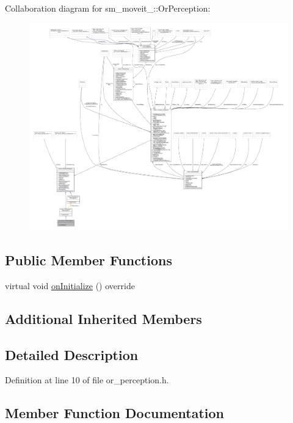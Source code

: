 Collaboration diagram for sm\+\_\+moveit\+\_\+:\+:Or\+Perception\+:
\nopagebreak
\begin{figure}[H]
\begin{center}
\leavevmode
\includegraphics[width=350pt]{classsm__moveit__4_1_1OrPerception__coll__graph}
\end{center}
\end{figure}
\subsection*{Public Member Functions}
\begin{DoxyCompactItemize}
\item 
virtual void \hyperlink{classsm__moveit__4_1_1OrPerception_a3dee7db3c38b7873653999b893d29bbf}{on\+Initialize} () override
\end{DoxyCompactItemize}
\subsection*{Additional Inherited Members}


\subsection{Detailed Description}


Definition at line 10 of file or\+\_\+perception.\+h.



\subsection{Member Function Documentation}
\mbox{\label{classsm__moveit__4_1_1OrPerception_a3dee7db3c38b7873653999b893d29bbf}} 
